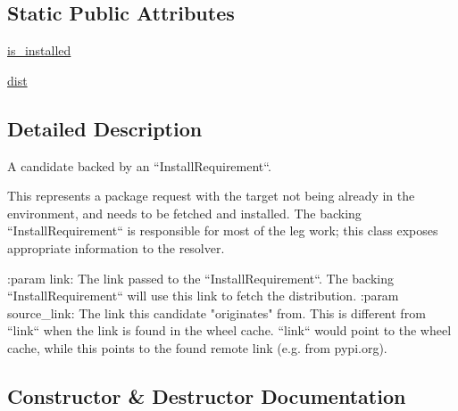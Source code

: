 \subsection*{Static Public Attributes}
\begin{DoxyCompactItemize}
\item 
\hyperlink{classpip_1_1__internal_1_1resolution_1_1resolvelib_1_1candidates_1_1__InstallRequirementBackedCandidate_a8c4c0391fe8ee7a62aa0c517d46d4c66}{is\+\_\+installed}
\item 
\hyperlink{classpip_1_1__internal_1_1resolution_1_1resolvelib_1_1candidates_1_1__InstallRequirementBackedCandidate_acda8bf221506d9cb4f22cb13d331acad}{dist}
\end{DoxyCompactItemize}


\subsection{Detailed Description}
\begin{DoxyVerb}A candidate backed by an ``InstallRequirement``.

This represents a package request with the target not being already
in the environment, and needs to be fetched and installed. The backing
``InstallRequirement`` is responsible for most of the leg work; this
class exposes appropriate information to the resolver.

:param link: The link passed to the ``InstallRequirement``. The backing
    ``InstallRequirement`` will use this link to fetch the distribution.
:param source_link: The link this candidate "originates" from. This is
    different from ``link`` when the link is found in the wheel cache.
    ``link`` would point to the wheel cache, while this points to the
    found remote link (e.g. from pypi.org).
\end{DoxyVerb}
 

\subsection{Constructor \& Destructor Documentation}
\mbox{\label{classpip_1_1__internal_1_1resolution_1_1resolvelib_1_1candidates_1_1__InstallRequirementBackedCandidate_a11564b6d1ba71462512cdbd272eeda4d}} 
